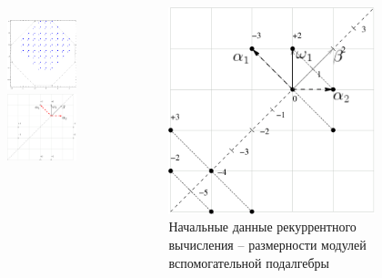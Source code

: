 \documentclass[pdftex]{beamer}
\theoremstyle{definition} \newtheorem{Def}{Определение}
\begin{document}
\begin{frame}[plain]

  \begin{columns}
    \begin{figure}[b]
      \centering
      \vspace{-0.5cm}
      \includegraphics[width=50mm]{figures/b2}      \\
      \includegraphics[width=50mm]{figures/figure1}
    \end{figure}
    \begin{figure}[b]
      \includegraphics[width=60mm]{figures/figure2}
      \caption{Начальные данные рекуррентного вычисления --  размерности модулей вспомогательной подалгебры}
    \end{figure}
  \end{columns}
\end{frame}
\end{document}
